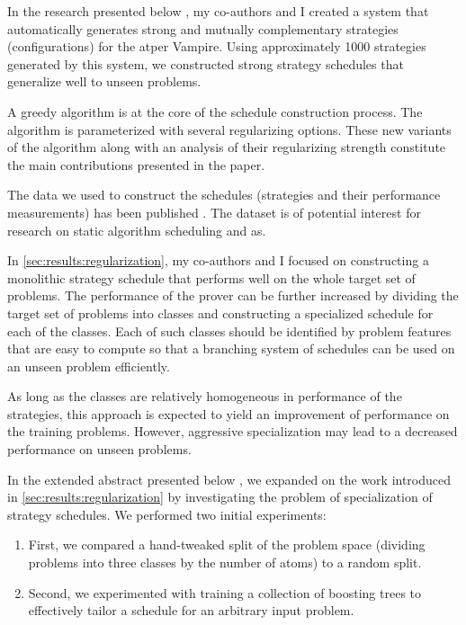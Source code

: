 
\label{sec:results:regularization}

In the research presented below \cite{DBLP:conf/ijcar/BartekCS24},
my co-authors and I created a system that automatically generates strong and mutually complementary strategies (configurations) for the \gls{atper} Vampire.
Using approximately 1000 strategies generated by this system,
we constructed strong strategy schedules that generalize well to unseen problems.

A greedy algorithm is at the core of the schedule construction process.
The algorithm is parameterized with several regularizing options.
These new variants of the algorithm along with an analysis of their regularizing strength
constitute the main contributions presented in the paper.

The data we used to construct the schedules (strategies and their performance measurements)
has been published \cite{bartek10814478}.
The dataset is of potential interest for research on static algorithm scheduling and \gls{as}.


\label{sec:results:cautious}

In \cref{sec:results:regularization},
my co-authors and I focused on constructing a monolithic strategy schedule that performs well on the whole target set of problems.
The performance of the prover can be further increased by dividing the target set of problems into classes
and constructing a specialized schedule for each of the classes.
Each of such classes should be identified by problem features that are easy to compute
so that a branching system of schedules can be used on an unseen problem efficiently.

As long as the classes are relatively homogeneous in performance of the strategies,
this approach is expected to yield an improvement of performance on the training problems.
However, aggressive specialization may lead to a decreased performance on unseen problems.

In the extended abstract presented below \cite{DBLP:conf/paar/BartekC024},
we expanded on the work introduced in \cref{sec:results:regularization}
by investigating the problem of specialization of strategy schedules.
We performed two initial experiments:
\begin{enumerate}
\item First, we compared a hand-tweaked split of the problem space (dividing problems into three classes by the number of atoms) to a random split.
\item Second, we experimented with training a collection of boosting trees to effectively tailor a schedule for an arbitrary input problem.
\end{enumerate}

